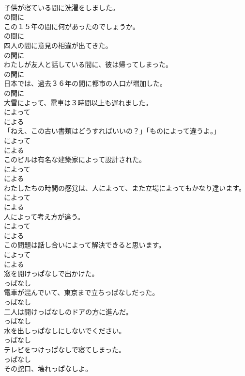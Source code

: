 \documentclass[8pt]{extreport}
\begin{document}
\begin{CJK}{UTF8}{min}
\\	子供が寝ている間に洗濯をしました。	
\\	の間に
\\	この１５年の間に何があったのでしょうか。	
\\	の間に
\\	四人の間に意見の相違が出てきた。	
\\	の間に
\\	わたしが友人と話している間に、彼は帰ってしまった。	
\\	の間に
\\	日本では、過去３６年の間に都市の人口が増加した。	
\\	の間に
\\	大雪によって、電車は３時間以上も遅れました。	
\\	によって 
\\	による
\\	「ねえ、この古い書類はどうすればいいの？」「ものによって違うよ。」	
\\	によって 
\\	による
\\	このビルは有名な建築家によって設計された。	
\\	によって 
\\	による
\\	わたしたちの時間の感覚は、人によって、また立場によってもかなり違います。	
\\	によって 
\\	による
\\	人によって考え方が違う。	
\\	によって 
\\	による
\\	この問題は話し合いによって解決できると思います。	
\\	によって 
\\	による
\\	窓を開けっぱなしで出かけた。	
\\	っぱなし
\\	電車が混んでいて、東京まで立ちっぱなしだった。	
\\	っぱなし
\\	二人は開けっぱなしのドアの方に進んだ。	
\\	っぱなし
\\	水を出しっぱなしにしないでください。	
\\	っぱなし
\\	テレビをつけっぱなしで寝てしまった。	
\\	っぱなし
\\	その蛇口、壊れっぱなしよ。	

\end{CJK}
\end{document}
